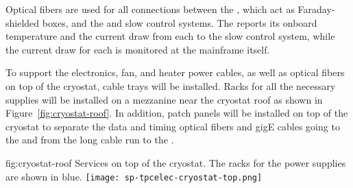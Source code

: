 Optical fibers are used for all connections between the , which act as
Faraday-shielded boxes, and the  and slow control systems.  The  reports
its onboard temperature and the current draw from each  to the slow control system, while the
current draw for each  is monitored at the mainframe itself.

To support the electronics, fan, and heater power cables, as well as optical fibers on top of the cryostat, 
cable trays will be installed. Racks for all the necessary  supplies will be installed on a mezzanine
near the cryostat roof as shown in Figure~\ref{fig:cryostat-roof}.
In addition, patch panels will be installed on top of the cryostat to separate the data and timing optical fibers and gigE
cables going to the  and  from the long cable run to the .

\begin{dunefigure}
{fig:cryostat-roof}
{Services on top of the cryostat. The racks for the  power supplies are shown in blue.}
\texttt{[image: sp-tpcelec-cryostat-top.png]}
\end{dunefigure}
